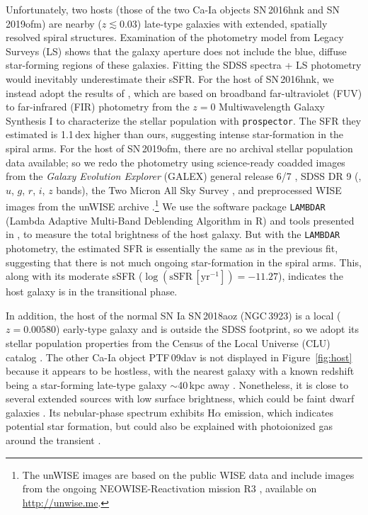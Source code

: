 \documentclass[twocolumn]{aastex631}
\begin{document}
Unfortunately, two hosts (those of the two Ca-Ia objects SN\,2016hnk and SN\,2019ofm) are nearby ($z \lesssim 0.03$) late-type galaxies with extended, spatially resolved spiral structures. Examination of the photometry model from Legacy Surveys (LS) shows that the galaxy aperture does not include the blue, diffuse star-forming regions of these galaxies. Fitting the SDSS spectra + LS photometry would inevitably underestimate their sSFR. For the host of SN\,2016hnk, we instead adopt the results of \citet{Dong_Ca-rich_2022}, which are based on broadband far-ultraviolet (FUV) to far-infrared (FIR) photometry from the $z=0$ Multiwavelength Galaxy Synthesis I \citep[z0MGS;][]{Leroy_2019} to characterize the stellar population with \texttt{prospector}. The SFR they estimated is 1.1\,dex higher than ours, suggesting intense star-formation in the spiral arms.
For the host of SN\,2019ofm, there are no archival stellar population data available; so we redo the photometry using science-ready coadded images from the \textit{Galaxy Evolution Explorer} (GALEX) general release 6/7 \citep[][$FUV$ and $NUV$ bands]{Martin2005a}, SDSS DR 9 (\citealp{Ahn2012a}, $u$, $g$, $r$, $i$, $z$ bands), the Two Micron All Sky Survey \citep[2MASS;][$H$ and $J$ bands]{Skrutskie2006a}, and preprocessed WISE images \citep{Wright2010a} from the unWISE archive \citep[][$W_1$ and $W_2$ bands]{Lang2014a}.\footnote{The unWISE images are based on the public WISE data and include images from the ongoing NEOWISE-Reactivation mission R3 \citep{Mainzer2014a, Meisner2017a}, available on \href{http://unwise.me}{http://unwise.me}.} We use the software package \texttt{LAMBDAR} (Lambda Adaptive Multi-Band Deblending Algorithm in R) \citep{Wright2016a} and tools presented in \citet{Schulze2021a}, to measure the total brightness of the host galaxy. But with the \texttt{LAMBDAR} photometry, the estimated SFR is essentially the same as in the previous fit, suggesting that there is not much ongoing star-formation in the spiral arms. This, along with its moderate sSFR ($\log (\mathrm{sSFR}\,[\mathrm{yr}^{-1}])=-11.27$), indicates the host galaxy is in the transitional phase.

In addition, the host of the normal SN Ia SN\,2018aoz (NGC\,3923) is a local ($z=0.00580$) early-type galaxy and is outside the SDSS footprint, so we adopt its stellar population properties from the Census of the Local Universe (CLU) catalog \citep{Cook_2019, de_Ca_rich_2020}. The other Ca-Ia object PTF\,09dav is not displayed in Figure~\ref{fig:host} because it appears to be hostless, with the nearest galaxy with a known redshift being a star-forming late-type galaxy $\sim$40\,kpc away \citep{Sullivan_2011}. Nonetheless, it is close to several extended sources with low surface brightness, which could be faint dwarf galaxies \citep[see Figure~3 in][]{Kasliwal_2012}. Its nebular-phase spectrum exhibits H$\alpha$ emission, which indicates potential star formation, but could also be explained with photoionized gas around the transient \citep{Kasliwal_2012}.
\end{document}
